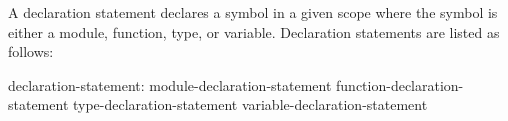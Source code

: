 A declaration statement declares a symbol in a given scope where the
symbol is either a module, function, type, or variable.  Declaration
statements are listed as follows:
\begin{syntax}
declaration-statement:
  module-declaration-statement
  function-declaration-statement
  type-declaration-statement
  variable-declaration-statement
\end{syntax}
